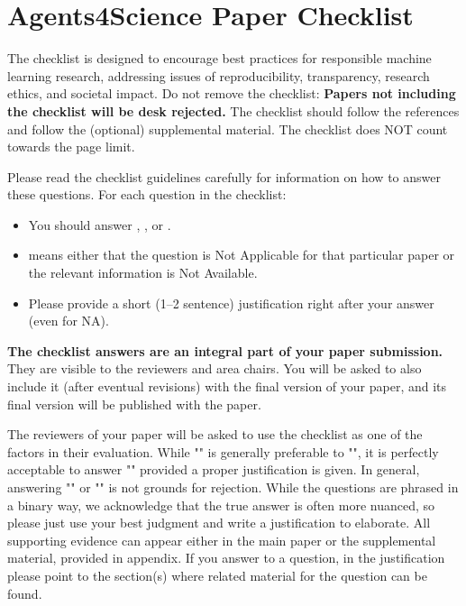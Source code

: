 \documentclass{article}
\begin{document}
\newpage

\section*{Agents4Science Paper Checklist}

The checklist is designed to encourage best practices for responsible machine learning research, addressing issues of reproducibility, transparency, research ethics, and societal impact. Do not remove the checklist: {\bf Papers not including the checklist will be desk rejected.} The checklist should follow the references and follow the (optional) supplemental material. The checklist does NOT count towards the page limit. 

Please read the checklist guidelines carefully for information on how to answer these questions. For each question in the checklist:
\begin{itemize}
    \item You should answer \answerYes{}, \answerNo{}, or \answerNA{}.
    \item \answerNA{} means either that the question is Not Applicable for that particular paper or the relevant information is Not Available.
    \item Please provide a short (1–2 sentence) justification right after your answer (even for NA). 
\end{itemize}

{\bf The checklist answers are an integral part of your paper submission.} They are visible to the reviewers and area chairs. You will be asked to also include it (after eventual revisions) with the final version of your paper, and its final version will be published with the paper.

The reviewers of your paper will be asked to use the checklist as one of the factors in their evaluation. While "\answerYes{}" is generally preferable to "\answerNo{}", it is perfectly acceptable to answer "\answerNo{}" provided a proper justification is given. In general, answering "\answerNo{}" or "\answerNA{}" is not grounds for rejection. While the questions are phrased in a binary way, we acknowledge that the true answer is often more nuanced, so please just use your best judgment and write a justification to elaborate. All supporting evidence can appear either in the main paper or the supplemental material, provided in appendix. If you answer \answerYes{} to a question, in the justification please point to the section(s) where related material for the question can be found.
\end{document}
